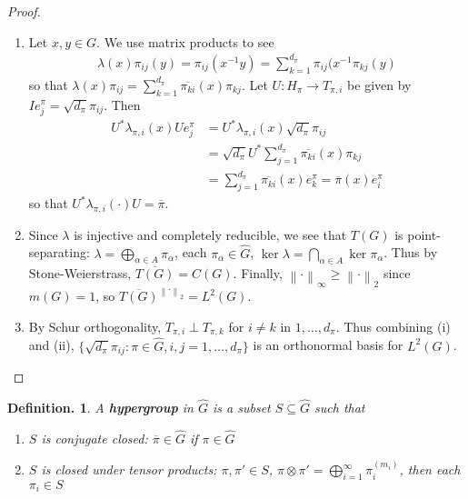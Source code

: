 \documentclass[11pt, a4paper]{memoir}
\newcommand{\norm}[1]{\ensuremath{\left\lVert#1\right\rVert}}
\theoremstyle{change}
\theoremstyle{plain}
\theoremstyle{nonumberplain}
\newtheorem{definition}{Definition.}
\newtheorem{proof}{Proof}
\newcommand{\defn}[1]{{\boldmath\bfseries #1}}
\numberwithin{equation}{section}
\begin{document}
\begin{proof}
    \begin{enumerate}[nl,r]
        \item Let $x,y\in G$.
            We use matrix products to see
            \begin{align*}
                \lambda(x)\pi_{ij}(y) =\pi_{ij}(x^{-1}y)=\sum_{k=1}^{d_\pi}\pi_{ij}(x^{-1}\pi_{kj}(y)
            \end{align*}
            so that $\lambda(x)\pi_{ij}=\sum_{k=1}^{d_\pi}\overline{\pi_{ki}}(x)\pi_{kj}$.
            Let $U:H_\pi\to T_{\pi,i}$ be given by $Ie_j^{\pi}=\sqrt{d_\pi}\pi_{ij}$.
            Then
            \begin{align*}
                U^*\lambda_{\pi,i}(x) Ue_j^\pi &= U^*\lambda_{\pi,i}(x)\sqrt{d_\pi}\pi_{ij}\\
                                               &= \sqrt{d_\pi}U^*\sum_{j=1}^{d_\pi}\overline{\pi_{ki}}(x)\pi_{kj}\\
                                               &= \sum_{j=1}^{d_\pi}\overline{\pi_{ki}}(x)e_k^\pi=\overline{\pi}(x)e_i^\pi
            \end{align*}
            so that $U^*\lambda_{\pi,i}(\cdot)U=\overline{\pi}$.
        \item Since $\lambda$ is injective and completely reducible, we see that $T(G)$ is point-separating: $\lambda=\bigoplus_{\alpha\in A}\pi_\alpha$, each $\pi_\alpha\in\widehat{G}$, $\ker\lambda=\bigcap_{\alpha\in A}\ker\pi_\alpha$.
            Thus by Stone-Weierstrass, $\overline{T(G)}=C(G)$.
            Finally, $\norm{\cdot}_\infty\geq\norm{\cdot}_2$ since $m(G)=1$, so $\overline{T(G)}^{\norm{\cdot}_2}=L^2(G)$.
        \item By Schur orthogonality, $T_{\pi,i}\perp T_{\pi,k}$ for $i\neq k$ in $1,\ldots,d_{\pi}$.
            Thus combining (i) and (ii), $\{\sqrt{d_\pi}\pi_{ij}:\pi\in\widehat{G},i,j=1,\ldots,d_\pi\}$ is an orthonormal basis for $L^2(G)$.
    \end{enumerate}
\end{proof}
\begin{definition}
    A \defn{hypergroup} in $\widehat{G}$ is a subset $S\subseteq\widehat{G}$ such that
    \begin{enumerate}[nl,a]
        \item $S$ is conjugate closed: $\overline{\pi}\in\widehat{G}$ if $\pi\in\widehat{G}$
        \item $S$ is closed under tensor products: $\pi,\pi'\in S$, $\pi\otimes\pi'=\bigoplus_{i=1}^\infty\pi_i^{(m_i)}$, then each $\pi_i\in S$
    \end{enumerate}
\end{definition}
\end{document}
